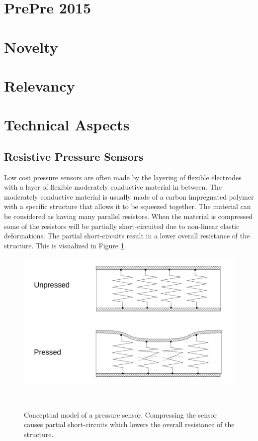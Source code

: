 \documentclass{sigchi-ext}
\begin{document}
\section{PrePre 2015}

\section{Novelty}

\section{Relevancy}

\section{Technical Aspects}
\subsection{Resistive Pressure Sensors}
Low cost pressure sensors are often made by the layering of flexible electrodes
with a layer of flexible moderately conductive material in between. The
moderately conductive material is usually made of a carbon impregnated polymer
with a specific structure that allows it to be squeezed together. The material
can be considered as having many parallel resistors. When the material is
compressed some of the resistors will be partially short-circuited due to
non-linear elastic deformations. The partial short-circuits result in a lower
overall resistance of the structure. This is visualized
in Figure \ref{fig:pressure_sensor}.

\begin{figure}[!htbp]
\centering
  \includegraphics[width=0.9\columnwidth]{figures/resistive_sensor}
  \caption{Conceptual model of a pressure sensor. Compressing the sensor causes
  partial short-circuits which lowers the overall resistance of the
  structure.}~\label{fig:pressure_sensor}
\end{figure}
\end{document}
